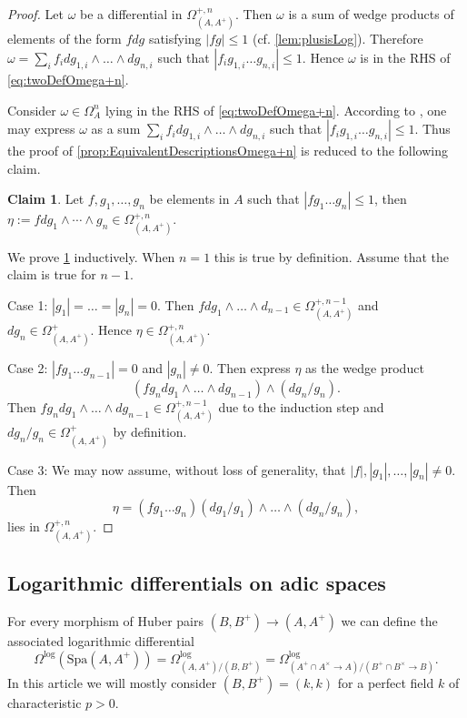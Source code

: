 \documentclass{amsart}
\def\Spa{\textrm{Spa}}
\theoremstyle{definition}
\newtheorem{claim}[theorem]{Claim}
\newcommand\llog{\mathrm{log}}
\numberwithin{equation}{section}
\begin{document}
\begin{proof}
	Let $\omega$ be a differential in $\Omega_{(A,A^+)}^{+,n}$. Then $\omega$ is a sum  of wedge products of elements of the form $fdg$ satisfying $|fg|\leq 1$ \cite[Lemma 7.3.]{LogDiff}(cf. \cref{lem:plusisLog}). Therefore $\omega=\sum\limits_{i}f_idg_{1,i}\wedge \dots \wedge dg_{n,i}$ such that $|f_ig_{1,i}\dots g_{n,i}|\leq 1$. Hence $\omega$ is in the RHS of  \eqref{eq:twoDefOmega+n}.
	
	Consider $\omega \in \Omega_A^n$ lying in the RHS of \eqref{eq:twoDefOmega+n}. According to \cite[Lemma 7.2]{LogDiff}, one may express $\omega$ as a sum $\sum\limits_{i}f_idg_{1,i}\wedge \dots \wedge dg_{n,i}$ such that $|f_ig_{1,i}\dots g_{n,i}|\leq 1$. Thus the proof of \cref{prop:EquivalentDescriptionsOmega+n} is reduced to the following claim.
	\begin{claim}\label{claim:EquivalentDescriptionsOmega+n}
		Let $f,g_1,\dots,g_n$ be elements in $A$ such that $|fg_1\dots g_n|\leq 1$, then $\eta:=fdg_1\wedge\cdots \wedge g_n\in \Omega_{(A,A^+)}^{+,n}$.
	\end{claim}
	We prove \cref{claim:EquivalentDescriptionsOmega+n} inductively. When $n=1$ this is true by definition. Assume that the claim is true for $n-1$. 
	
	\textrm{Case 1:} $|g_1|=\dots=|g_n|=0$. Then $fdg_1\wedge \dots \wedge d_{n-1}\in \Omega_{(A,A^+)}^{+,n-1}$ and $dg_n\in \Omega_{(A,A^+)}^{+}$. Hence $\eta\in\Omega_{(A,A^+)}^{+,n}$.
	
	\textrm{Case 2:} $|fg_1\dots g_{n-1}|=0$ and $|g_{n}|\neq 0$. Then express $\eta$ as the wedge product 
	\[
	(fg_n dg_1\wedge \dots\wedge dg_{n-1} )\wedge  (dg_n/g_n).
	\]
	Then $fg_ndg_1\wedge\dots \wedge dg_{n-1}\in \Omega_{(A,A^+)}^{+,n-1}$ due to the induction step and $dg_n/g_n\in \Omega_{(A,A^+)}^{+}$ by definition.
	
	\textrm{Case 3:} We may now assume, without loss of generality, that $|f|, |g_1|,\dots,|g_n| \neq 0$. Then 
	\[
	\eta= (fg_1\dots g_n)(dg_1/g_1)\wedge \dots \wedge (dg_n/g_n),
	\]
	lies in $\Omega_{(A,A^+)}^{+,n}$. 
\end{proof}
\subsection{Logarithmic differentials on adic spaces}
For every morphism of Huber pairs $(B,B^+)\to(A,A^+)$ we can define the associated logarithmic differential
\[
\Omega^{\textrm{log}}(\Spa(A,A^+))=\Omega_{(A,A^+)/(B,B^+)}^{\textrm{log}}=\Omega^{\llog}_{(A^+\cap A^\times\to A)/(B^+\cap B^\times\to B)}.
\]
In this article we will mostly consider $(B,B^+)=(k,k)$ for a  perfect field $k$ of characteristic $p>0$. 
\end{document}
